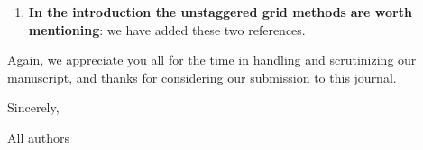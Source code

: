 \documentclass[twoside,11pt]{article}
\begin{document}
\begin{enumerate}
\item \textbf{In the introduction the unstaggered grid methods} \cite{kozdon2013simulation,duru2016dynamic} \textbf{are worth mentioning}: we have added these two references.

\end{enumerate}

Again, we appreciate you all for the time in handling and scrutinizing our manuscript, and thanks for considering our submission to this journal.

Sincerely, 

All authors



\end{document}
